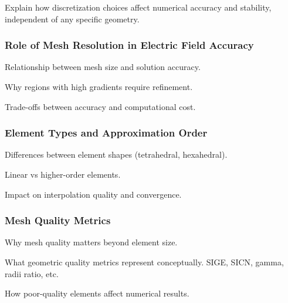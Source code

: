 Explain how discretization choices affect numerical accuracy and stability, independent of any specific geometry.
\subsubsection{Role of Mesh Resolution in Electric Field Accuracy}
Relationship between mesh size and solution accuracy.

Why regions with high gradients require refinement.

Trade-offs between accuracy and computational cost.

\subsubsection{Element Types and Approximation Order}
Differences between element shapes (tetrahedral, hexahedral).

Linear vs higher-order elements.

Impact on interpolation quality and convergence.
\subsubsection{Mesh Quality Metrics}
Why mesh quality matters beyond element size.

What geometric quality metrics represent conceptually. SIGE, SICN, gamma, radii ratio, etc.

How poor-quality elements affect numerical results.
